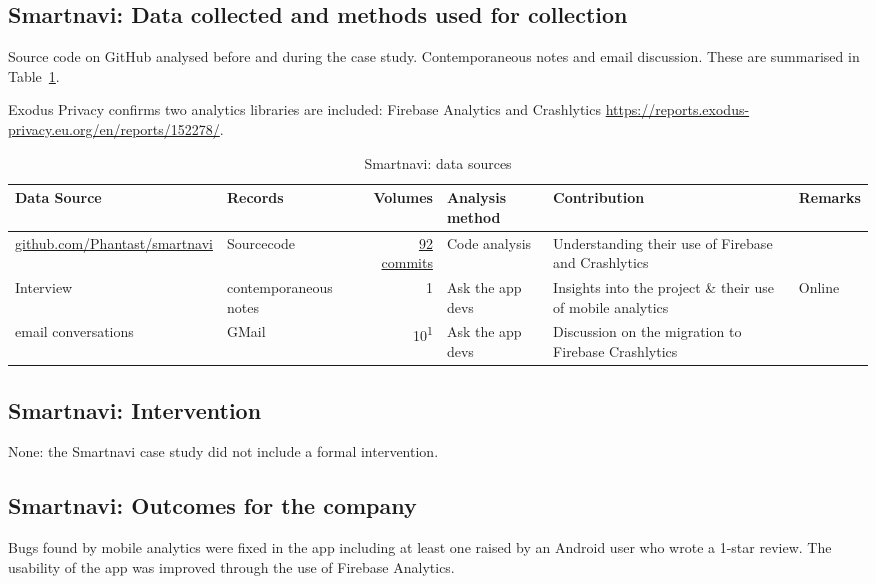 \subsection{Smartnavi: Data collected and methods used for collection}
Source code on GitHub analysed before and during the case study. Contemporaneous notes and email discussion. These are summarised in Table~\ref{tab:smartnavi-data-sources}.

Exodus Privacy confirms two analytics libraries are included: Firebase Analytics and Crashlytics \url{https://reports.exodus-privacy.eu.org/en/reports/152278/}.


\begin{table}
    \centering
    \footnotesize
    \tabcolsep=0.12cm
    \begin{tabular}{p{4cm}p{2.4cm}rp{2.1cm}p{3cm}p{1.2cm}}
        Data Source & Records & Volumes & Analysis method & Contribution & Remarks \\
        \toprule
        {\tiny \href{https://github.com/Phantast/smartnavi}{github.com/Phantast/smartnavi}} & Sourcecode & \href{https://github.com/Phantast/smartnavi/commits/master}{92 commits} & Code analysis & Understanding their use of Firebase and Crashlytics & \\
         Interview & contemporaneous notes & 1 & Ask the app devs & Insights into the project \& their use of mobile analytics & Online  \\
         email conversations & GMail & 10\textsuperscript{1} & Ask the app devs & Discussion on the migration to Firebase Crashlytics &  \\
         \bottomrule
    \end{tabular}
    \caption{Smartnavi: data sources}
    \label{tab:smartnavi-data-sources}
\end{table}



\subsection{Smartnavi: Intervention}
None: the Smartnavi case study did not include a formal intervention.

\subsection{Smartnavi: Outcomes for the company}
Bugs found by mobile analytics were fixed in the app including at least one raised by an Android user who wrote a 1-star review. The usability of the app was improved through the use of Firebase Analytics. 


